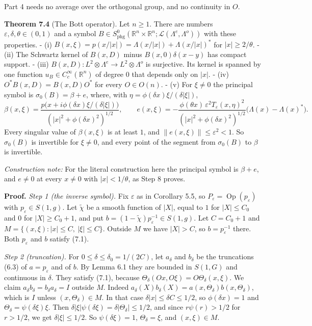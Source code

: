 \documentclass[
  11pt,
]{article}
\begin{document}
Part 4 needs no average over the orthogonal group, and no continuity in
\(O\).

\textbf{Theorem 7.4} (The Bott operator). Let \(n\ge1\). There are
numbers \(\varepsilon,\delta,\theta\in(0,1)\) and a symbol
\(B\in S^0_{\mathrm{phg}}(\mathbb R^n\times\mathbb R^n;\mathcal L(\Lambda^e,\Lambda^o))\)
with these properties. - (i)
\(B(x,\xi)=p(x/|x|)=\Lambda(x/|x|)+\Lambda(x/|x|)^*\) for
\(|x|\ge2/\theta\). - (ii) The Schwartz kernel of \(B(x,D)\) minus
\(B(x,0)\delta(x-y)\) has compact support. - (iii)
\(B(x,D):L^2\otimes\Lambda^e\to L^2\otimes\Lambda^o\) is surjective. Its
kernel is spanned by one function \(u_B\in C_c^\infty(\mathbb R^n)\) of
degree \(0\) that depends only on \(|x|\). - (iv)
\(O^*B(x,D)=B(x,D)O^*\) for every \(O\in O(n)\). - (v) For \(\xi\ne0\)
the principal symbol is \(\sigma_0(B)=\beta+e\), where, with
\(\eta=\phi(\delta x)\xi/(\delta|\xi|)\), \[
\beta(x,\xi)=\frac{p\bigl(x+i\phi(\delta x)\xi/(\delta|\xi|)\bigr)}{(|x|^2+\phi(\delta x)^2)^{1/2}},\qquad
e(x,\xi)=-\frac{\phi(\theta x)\,\varepsilon^2T_\varepsilon(x,\eta)^2}{(|x|^2+\phi(\delta x)^2)^{1/2}}\bigl(\Lambda(x)-\Lambda(x)^*\bigr).
\tag{7.2}
\] Every singular value of \(\beta(x,\xi)\) is at least \(1\), and
\(\|e(x,\xi)\|\le\varepsilon^2<1\). So \(\sigma_0(B)\) is invertible for
\(\xi\ne0\), and every point of the segment from \(\sigma_0(B)\) to
\(\beta\) is invertible.

\emph{Construction note:} For the literal construction here the
principal symbol is \(\beta+e\), and \(e\ne0\) at every \(x\ne0\) with
\(|x|<1/\theta\), as Step 8 proves.

\textbf{Proof.} \emph{Step 1 (the inverse symbol).} Fix \(\varepsilon\)
as in Corollary 5.5, so
\(P_\varepsilon=\operatorname{Op}(p_\varepsilon)\) with
\(p_\varepsilon\in S(1,g)\). Let \(\tilde\chi\) be a smooth function of
\(|X|\), equal to \(1\) for \(|X|\le C_0\) and \(0\) for
\(|X|\ge C_0+1\), and put
\(b=(1-\tilde\chi)p_\varepsilon^{-1}\in S(1,g)\). Let \(C=C_0+1\) and
\(M=\{(x,\xi):|x|\le C,\ |\xi|\le C\}\). Outside \(M\) we have
\(|X|>C\), so \(b=p_\varepsilon^{-1}\) there. Both \(p_\varepsilon\) and
\(b\) satisfy (7.1).

\emph{Step 2 (truncation).} For \(0\le\delta\le\delta_0=1/(2C)\), let
\(a_\delta\) and \(b_\delta\) be the truncations (6.3) of
\(a=p_\varepsilon\) and of \(b\). By Lemma 6.1 they are bounded in
\(S(1,G)\) and continuous in \(\delta\). They satisfy (7.1), because
\(\Theta_\delta(Ox,O\xi)=O\Theta_\delta(x,\xi)\). We claim
\(a_\delta b_\delta=b_\delta a_\delta=I\) outside \(M\). Indeed
\(a_\delta(X)b_\delta(X)=a(x,\Theta_\delta)b(x,\Theta_\delta)\), which
is \(I\) unless \((x,\Theta_\delta)\in M\). In that case
\(\delta|x|\le\delta C\le1/2\), so \(\phi(\delta x)=1\) and
\(\Theta_\delta=\psi(\delta\xi)\xi\). Then
\(\delta|\xi|\psi(\delta\xi)=\delta|\Theta_\delta|\le1/2\), and since
\(r\psi(r)>1/2\) for \(r>1/2\), we get \(\delta|\xi|\le1/2\). So
\(\psi(\delta\xi)=1\), \(\Theta_\delta=\xi\), and \((x,\xi)\in M\).
\end{document}
